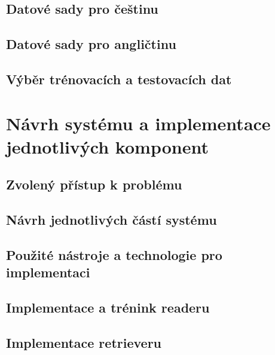 \section{Datové sady pro češtinu}
\blindtext[4]
\section{Datové sady pro angličtinu}
\blindtext[4]
\section{Výběr trénovacích a testovacích dat}
\blindtext[4]


\chapter{Návrh systému a implementace jednotlivých komponent}

\blindtext[2]
\section{Zvolený přístup k problému}
\blindtext[6]
\section{Návrh jednotlivých částí systému}
\blindtext[15]
\section{Použité nástroje a technologie pro implementaci}
\blindtext[6]
\section{Implementace a trénink readeru}
\blindtext[8]
\section{Implementace retrieveru}
\blindtext[10]
